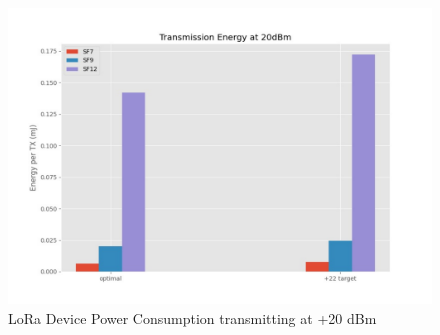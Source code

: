 \begin{figure}[h!]
    \centering
    \includegraphics[width=\columnwidth]{figures/loratx20dbmbar.pdf}
    \caption{LoRa Device Power Consumption transmitting at +20 dBm}
    \label{fig:loratx20dbmbar}
\end{figure}